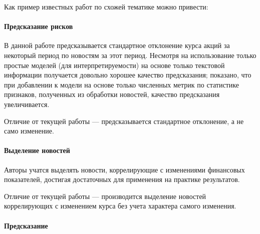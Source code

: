 \documentclass[pdftex,ptm,12pt,a4paper]{report}
\begin{document}
Как пример известных работ по схожей тематике можно привести:

\paragraph{Предсказание рисков \cite{risk_predict}}

В данной работе предсказывается стандартное отклонение курса акций за некоторый период по новостям за этот период.
Несмотря на использование только простые моделей (для интерпретируемости) на основе только текстовой информации получается
довольно хорошее качество предсказания; показано, что при добавлении к модели на основе только численных метрик по статистике
 признаков, полученных из обработки новостей, качество предсказания увеличивается.

Отличие от текущей работы --- предсказывается стандартное отклонение, а не само изменение.

\paragraph{Выделение новостей \cite{select_important_news}}

Авторы учатся выделять новости, коррелирующие с изменениями финансовых показателей, достигая достаточных для
применения на практике результатов.

Отличие от текущей работы --- производится выделение новостей коррелирующих с изменением курса без учета характера
самого изменения.

\paragraph{Предсказание \cite{stock_from_twitter}}



{}

\end{document}
